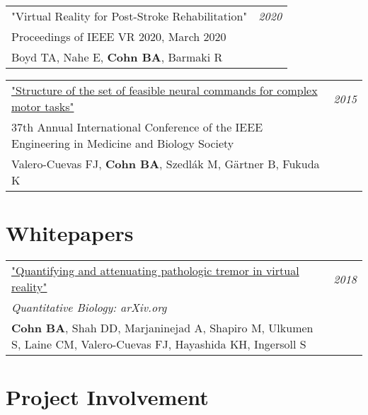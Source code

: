 \documentclass[10pt,a4paper]{article}
\begin{document}
\vspace*{1mm}\noindent\begin{tabularx}{17cm}{X r}
   "Virtual Reality for Post-Stroke Rehabilitation" & \textit{2020}\\
    Proceedings of IEEE VR 2020, March 2020 \\
    Boyd TA, Nahe E, \textbf{Cohn BA}, Barmaki R \\[2mm]
\end{tabularx}

\vspace*{1mm}\noindent\begin{tabularx}{17cm}{X r}
    \href{https://github.com/bc/resume/raw/master/papers/valero_cuevas_et_al_2015_ieee_embs.pdf}{"Structure of the set of feasible neural commands for complex motor tasks" } & \textit{2015}\\
    37th Annual International Conference of the IEEE Engineering in Medicine and Biology Society \\
    Valero-Cuevas FJ, \textbf{Cohn BA}, Szedl\'{a}k M, G{\"a}rtner B, Fukuda K \\[2mm]
\end{tabularx}


\vspace*{3mm}\section*{Whitepapers}

\vspace*{1mm}\noindent\begin{tabularx}{17cm}{X r}
  \href{https://arxiv.org/pdf/1809.05970.pdf}{"Quantifying and attenuating pathologic tremor in virtual reality"} & \textit{2018} \\ %
  \textit{Quantitative Biology: arXiv.org} \\
  \textbf{Cohn BA}, Shah DD, Marjaninejad A, Shapiro M, Ulkumen S, Laine CM, Valero-Cuevas FJ, Hayashida KH, Ingersoll S \\[2mm]
\end{tabularx}


\vspace*{3mm}\section*{Project Involvement}
\end{document}
